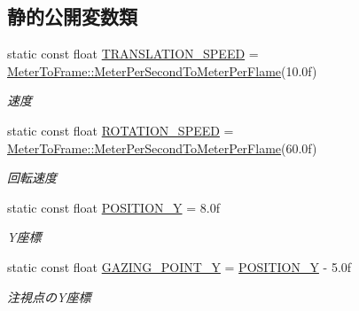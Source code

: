 \subsection*{静的公開変数類}
\begin{DoxyCompactItemize}
\item 
static const float \mbox{\hyperlink{class_camera_state___crawl_up_a7db98276f51f2ff481d491a69840aee9}{T\+R\+A\+N\+S\+L\+A\+T\+I\+O\+N\+\_\+\+S\+P\+E\+ED}} = \mbox{\hyperlink{class_meter_to_frame_aa5468938f59eb934bfc6a897a7513812}{Meter\+To\+Frame\+::\+Meter\+Per\+Second\+To\+Meter\+Per\+Flame}}(10.\+0f)
\begin{DoxyCompactList}\small\item\em 速度 \end{DoxyCompactList}\item 
static const float \mbox{\hyperlink{class_camera_state___crawl_up_af1e1ad90d163cbf9c3abfe9ee21470ed}{R\+O\+T\+A\+T\+I\+O\+N\+\_\+\+S\+P\+E\+ED}} = \mbox{\hyperlink{class_meter_to_frame_aa5468938f59eb934bfc6a897a7513812}{Meter\+To\+Frame\+::\+Meter\+Per\+Second\+To\+Meter\+Per\+Flame}}(60.\+0f)
\begin{DoxyCompactList}\small\item\em 回転速度 \end{DoxyCompactList}\item 
static const float \mbox{\hyperlink{class_camera_state___crawl_up_ac2e1ac195bd2fcb6b5af30879f989b28}{P\+O\+S\+I\+T\+I\+O\+N\+\_\+Y}} = 8.\+0f
\begin{DoxyCompactList}\small\item\em Y座標 \end{DoxyCompactList}\item 
static const float \mbox{\hyperlink{class_camera_state___crawl_up_aa8bd8cbf7251f4036c432ae1bb4cfdc1}{G\+A\+Z\+I\+N\+G\+\_\+\+P\+O\+I\+N\+T\+\_\+Y}} = \mbox{\hyperlink{class_camera_state___crawl_up_ac2e1ac195bd2fcb6b5af30879f989b28}{P\+O\+S\+I\+T\+I\+O\+N\+\_\+Y}} -\/ 5.\+0f
\begin{DoxyCompactList}\small\item\em 注視点の\+Y座標 \end{DoxyCompactList}\end{DoxyCompactItemize}
